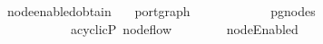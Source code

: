 \ node{\isacharunderscore}enabled{\isacharunderscore}obtain{\isacharcolon}\isanewline
\ \ \ port{\isacharunderscore}graph\ \isanewline
\ \ \ \ \ \ \ \ \ \ \ {\isachardoublequoteopen}pg{\isacharunderscore}nodes\ \ {\isasymnoteq}\ {\isacharbrackleft}{\isacharbrackright}{\isachardoublequoteclose}\isanewline
\ \ \ \ \ \ \ \ \ \ \ {\isachardoublequoteopen}acyclicP\ {\isacharparenleft}node{\isacharunderscore}flow\ \isanewline
\ \ \ \ \ \ \ {\isachardoublequoteopen}nodeEnabled\ \ 
